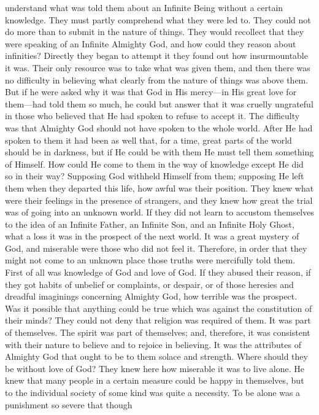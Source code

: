 understand what was told them about an Infinite Being without a
certain knowledge. They must partly comprehend what they were led to.
They could not do more than to submit in the nature of things. They
would recollect that they were speaking of an Infinite Almighty God,
and how could they reason about infinities? Directly they began to
attempt it they found out how insurmountable it was. Their only
resource was to take what was given them, and then there was no
difficulty in believing what clearly from the nature of things was
above them. But if he were asked why it was that God in His mercy—in
His great love for them—had told them so much, he could but answer
that it was cruelly ungrateful in those who believed that He had
spoken to refuse to accept it. The difficulty was that Almighty God
should not have spoken to the whole world. After He had spoken to them
it had been as well that, for a time, great parts of the world should
be in darkness, but if He could be with them He must tell them
something of Himself. How could He come to them in the way of
knowledge except He did so in their way? Supposing God withheld
Himself from them; supposing He left them when they departed this
life, how awful was their position. They knew what were their feelings
in the presence of strangers, and they knew how great the trial was of
going into an unknown world. If they did not learn to accustom
themselves to the idea of an Infinite Father, an Infinite Son, and an
Infinite Holy Ghost, what a loss it was in the prospect of the next
world. It was a great mystery of God, and miserable were those who did
not feel it. Therefore, in order that they might not come to an
unknown place those truths were mercifully told them. First of all was
knowledge of God and love of God. If they abused their reason, if they
got habits of unbelief or complaints, or despair, or of those heresies
and dreadful imaginings concerning Almighty God, how terrible was the
prospect. Was it possible that anything could be true which was
against the constitution of their minds? They could not deny that
religion was required of them. It was part of themselves. The spirit
was part of themselves; and, therefore, it was consistent with their
nature to believe and to rejoice in believing. It was the attributes
of Almighty God that ought to be to them solace and strength. Where
should they be without love of God? They knew here how miserable it
was to live alone. He knew that many people in a certain measure could
be happy in themselves, but to the individual society of some kind was
quite a necessity. To be alone was a punishment so severe that though
